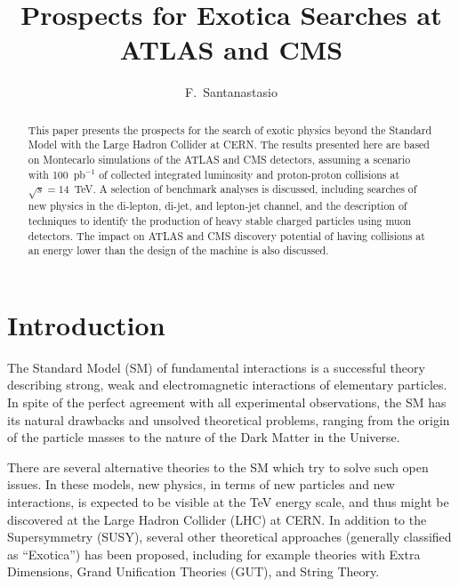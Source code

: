 \documentclass{cimento}
\title{Prospects for Exotica Searches at ATLAS and CMS}
\author{F.~Santanastasio\from{ins:UMD}\ETC
}
\begin{document}
\maketitle

\begin{abstract}
This paper presents the prospects for the search of exotic physics 
beyond the Standard Model with the Large Hadron Collider at CERN. 
The results presented here are based on Montecarlo simulations of the
ATLAS and CMS detectors, assuming a scenario with 
100~pb$^{-1}$ of collected integrated luminosity and proton-proton collisions 
at $\sqrt{s} = 14$~TeV. A selection of benchmark analyses is discussed, 
including searches of new physics in the di-lepton, di-jet, and lepton-jet channel, 
and the description of techniques to identify the production of 
heavy stable charged particles using muon detectors. 
The impact on ATLAS and CMS discovery potential 
of having collisions at an energy lower than the design of the machine 
is also discussed.
\end{abstract}

\section{Introduction}
The Standard Model (SM) of fundamental interactions is a successful theory 
describing strong, weak and electromagnetic interactions of elementary 
particles. 
In spite of the perfect agreement with all experimental 
observations, the SM has its natural drawbacks and unsolved theoretical 
problems, ranging from the origin of the particle masses to the nature of the 
Dark Matter in the Universe.

There are several alternative theories to the SM which try to solve such 
open issues. In these models, new physics, in terms of new particles and 
new interactions, is expected to be visible at the TeV energy scale, and 
thus might be discovered at the Large Hadron Collider (LHC) at CERN.
In addition to the Supersymmetry (SUSY), 
several other theoretical approaches 
(generally classified as ``Exotica'') has been proposed, 
including for example theories with Extra Dimensions, 
Grand Unification Theories (GUT), and String Theory. 
\end{document}
